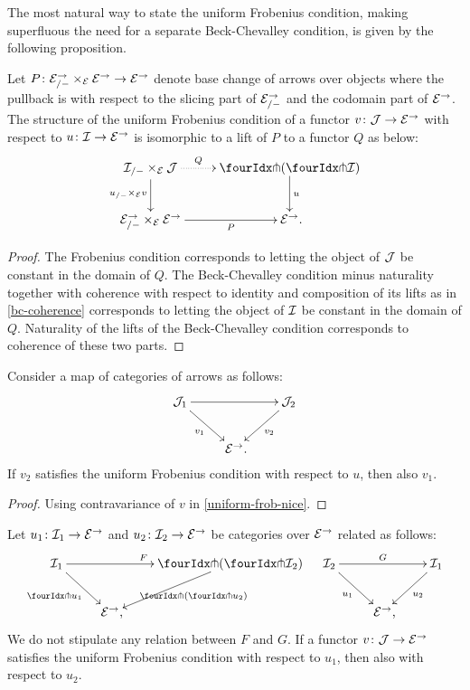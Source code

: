 \documentclass[reqno,10pt,a4paper,oneside,draft]{amsart}
\begin{document}
The most natural way to state the uniform Frobenius condition, making superfluous the need for a separate Beck-Chevalley condition, is given by the following proposition.

\begin{proposition}
\label{uniform-frob-nice}
Let $P \co \cal{E}^\to_{/-} \times_{\cal{E}} \cal{E}^\to \to \cal{E}^\to$ denote base change of arrows over objects where the pullback is with respect to the slicing part of $\cal{E}^\to_{/-}$ and the codomain part of $\cal{E}^\to$.
The structure of the uniform Frobenius condition of a functor $v \co \cal{J} \to \cal{E}^\to$ with respect to $u \co \cal{I} \to \cal{E}^\to$ is isomorphic to a lift of $P$ to a functor $Q$ as below:
\[
\xymatrix{
  \cal{I}_{/-} \times_{\cal{E}} \cal{J}
  \ar@{.>}[r]^-{Q}
  \ar[d]_{u_{/-} \times_{\cal{E}} v}
&
  \liftl{(\liftr{\cal{I}})}
  \ar[d]^{u}
\\
  \cal{E}^\to_{/-} \times_{\cal{E}} \cal{E}^\to
  \ar[r]_-{P}
&
  \cal{E}^\to
\rlap{.}}
\]
\end{proposition}

\begin{proof}
The Frobenius condition corresponds to letting the object of $\cal{J}$ be constant in the domain of $Q$.
The Beck-Chevalley condition minus naturality together with coherence with respect to identity and composition of its lifts as in \cref{bc-coherence} corresponds to letting the object of $\cal{I}$ be constant in the domain of $Q$.
Naturality of the lifts of the Beck-Chevalley condition corresponds to coherence of these two parts.
\end{proof}

\begin{proposition} \label{uniform-frobenius-change-v}
Consider a map of categories of arrows as follows:
\[
\xymatrix{
  \cal{J}_1
  \ar[rr]
  \ar[dr]_{v_1}
&&
  \cal{J}_2
  \ar[dl]^{v_2}
\\&
  \catE^\to
\rlap{.}}
\]
If $v_2$ satisfies the uniform Frobenius condition with respect to $u$, then also $v_1$.
\end{proposition}

\begin{proof}
Using contravariance of $v$ in \cref{uniform-frob-nice}.
\end{proof}

\begin{proposition} \label{uniform-frobenius-change-u}
Let $u_1 \co \cal{I}_1 \to \catE^\to$ and $u_2 \co \cal{I}_2 \to \catE^\to$ be categories over $\catE^\to$ related as follows:
\begin{align*}
\xymatrix{
  \cal{I}_1
  \ar[rr]^{F}
  \ar[dr]_{\liftr{u_1}}
&&
  \liftl{(\liftr{\cal{I}_2})}
  \ar[dl]^{\liftl{(\liftr{u_2})}}
\\&
  \catE^\to
\rlap{,}}
&&
\xymatrix{
  \cal{I}_2
  \ar[rr]^{G}
  \ar[dr]_{u_1}
&&
  \cal{I}_1
  \ar[dl]^{u_2}
\\&
  \catE^\to
\rlap{,}}
\end{align*}
We do not stipulate any relation between $F$ and $G$.
If a functor $v \co \cal{J} \to \catE^\to$ satisfies the uniform Frobenius condition with respect to $u_1$, then also with respect to $u_2$.
\end{proposition}
\end{document}
